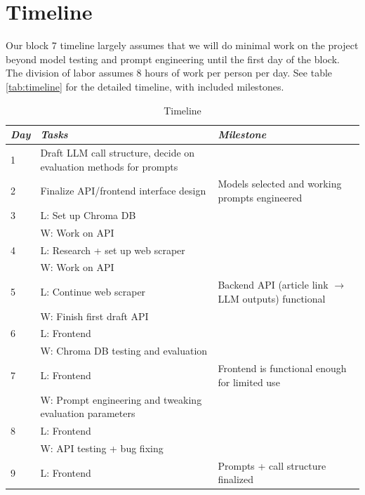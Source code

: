 \documentclass[conference]{IEEEtran}
\begin{document}

\section{Timeline}
Our block 7 timeline largely assumes that we will do minimal work on the project beyond model testing and prompt engineering until the first day of the block. The division of labor assumes 8 hours of work per person per day. See table \ref{tab:timeline} for the detailed timeline, with included milestones.

\begin{table}[ht]
\caption{Timeline}
\begin{center}
\begin{tabularx}{\columnwidth}{|l|X|X|} %
\hline
\textbf{\textit{Day}} & \textbf{\textit{Tasks}} & \textbf{\textit{Milestone}}  \\
\hline
1 & Draft LLM call structure, decide on evaluation methods for prompts & \\
\hline
2 & Finalize API/frontend interface design & Models selected and working prompts engineered \\
\hline
3 & L: Set up Chroma DB & \\
& W: Work on API & \\
\hline
4 & L: Research + set up web scraper & \\
& W: Work on API & \\
\hline
5 & L: Continue web scraper & Backend API (article link $\rightarrow$ LLM outputs) functional \\
& W: Finish first draft API & \\
\hline
6 & L: Frontend & \\
& W: Chroma DB testing and evaluation & \\
\hline
7 & L: Frontend & Frontend is functional enough for limited use \\
& W: Prompt engineering and tweaking evaluation parameters & \\
\hline
8 & L: Frontend & \\
& W: API testing + bug fixing & \\
\hline
9 & L: Frontend & Prompts + call structure finalized \\

\end{tabularx}
\end{center}
\end{table}
\end{document}
